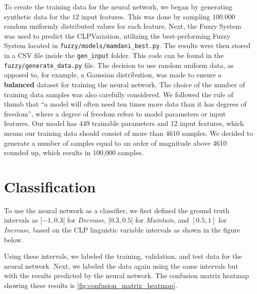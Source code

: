 \documentclass[titlepage]{article}
\begin{document}
To create the training data for the neural network, we began by generating synthetic data for the $12$ input features.
This was done by sampling $100.000$ random uniformly distributed values for each feature.
Next, the Fuzzy System was used to predict the CLPVariation, utilizing the best-performing Fuzzy System located in \texttt{fuzzy/models/mamdani\_best.py}.
The results were then stored in a CSV file inside the \texttt{gen\_input} folder.
This code can be found in the \texttt{fuzzy/generate\_data.py} file.
The decision to use random uniform data, as opposed to, for example, a Gaussian distribution, was made to ensure a \textbf{balanced} dataset for training the neural network.
The choice of the number of training data samples was also carefully considered.
We followed the rule of thumb that ``a model will often need ten times more data than it has degrees of freedom'', where a degree of freedom refers to model parameters or input features.
Our model has 449 trainable parameters and 12 input features, which means our training data should consist of more than $4610$ samples.
We decided to generate a number of samples equal to an order of magnitude above 4610 rounded up, which results in 100,000 samples.

\section{Classification}

To use the neural network as a classifier, we first defined the ground truth intervals as \([-1, 0.3[\) for \emph{Decrease}, \([0.3, 0.5[\) for \emph{Maintain}, and \([0.5, 1]\) for \emph{Increase}, based on the CLP linguistic variable intervals as shown in the figure below.

Using these intervals, we labeled the training, validation, and test data for the neural network.
Next, we labeled the data again using the same intervals but with the results predicted by the neural network.
The confusion matrix heatmap showing these results is \cref{fig:confusion_matrix_heatmap}.
\end{document}
